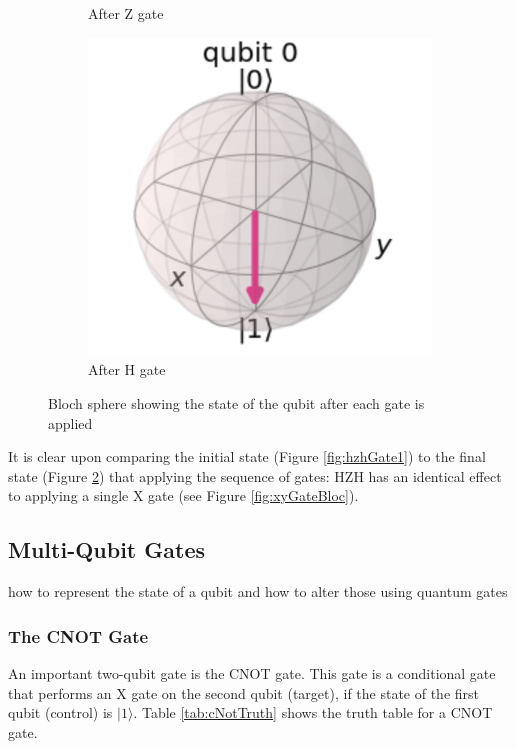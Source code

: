 \begin{figure}[h]
\begin{subfigure}[h]{0.24\textwidth}
        \caption{After Z gate}
        \label{fig:hzhGate3}
    \end{subfigure}
        \begin{subfigure}[h]{0.24\textwidth}
        \centering
        \includegraphics[width=\textwidth]{lab2/images/hzhGate4.png}
        \caption{After H gate}
        \label{fig:hzhGate4}
    \end{subfigure}
    \caption{Bloch sphere showing the state of the qubit after each gate is applied} 
    \label{fig:bSphereHZHGate}
\end{figure}

It is clear upon comparing the initial state (Figure \ref{fig:hzhGate1}) to the final state (Figure \ref{fig:hzhGate4}) that applying the sequence of gates: HZH has an identical effect to applying a single X gate (see Figure \ref{fig:xyGateBloc}).

\subsection{Multi-Qubit Gates}

how to represent the state of a qubit and how to alter those using quantum gates

\subsubsection{The CNOT Gate}
An important two-qubit gate is the CNOT gate. This gate is a conditional gate that performs an X gate on the second qubit (target), if the state of the first qubit (control) is  $|1\rangle$. Table \ref{tab:cNotTruth} shows the truth table for a CNOT gate.

